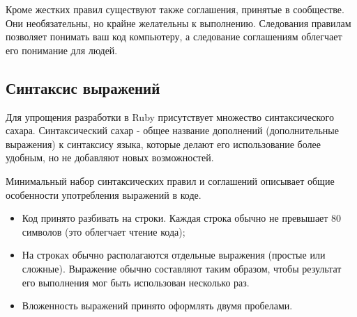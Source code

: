 \begin{note}
  Кроме жестких правил существуют также соглашения, принятые в сообществе. Они необязательны, но крайне желательны к выполнению. Следования правилам позволяет понимать ваш код компьютеру, а следование соглашениям облегчает его понимание для людей.
\end{note}

\subsection{Синтаксис выражений}

Для упрощения разработки в Ruby присутствует множество синтаксического сахара. Синтаксический сахар - общее название дополнений (дополнительные выражения) к синтаксису языка, которые делают его использование более удобным, но не добавляют новых возможностей.

Минимальный набор синтаксических правил и соглашений описывает общие особенности употребления выражений в коде.

\begin{itemize}
  \item Код принято разбивать на строки. Каждая строка обычно не превышает 80 символов (это облегчает чтение кода);

  \item На строках обычно располагаются отдельные выражения (простые или сложные). Выражение обычно составляют таким образом, чтобы результат его выполнения мог быть использован несколько раз.

  \item Вложенность выражений принято оформлять двумя пробелами.
\end{itemize}

